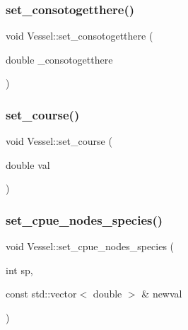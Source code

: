 \mbox{\label{class_vessel_a159a8bbab0239bd61c339ff734c7f2fc}} 
\subsubsection{\texorpdfstring{set\_consotogetthere()}{set\_consotogetthere()}}
{\footnotesize\ttfamily void Vessel\+::set\+\_\+consotogetthere (\begin{DoxyParamCaption}\item[{double}]{\+\_\+consotogetthere }\end{DoxyParamCaption})}

\mbox{\label{class_vessel_ace602731bba3ee9d57624cb50b9f4753}} 
\subsubsection{\texorpdfstring{set\_course()}{set\_course()}}
{\footnotesize\ttfamily void Vessel\+::set\+\_\+course (\begin{DoxyParamCaption}\item[{double}]{val }\end{DoxyParamCaption})}

\mbox{\label{class_vessel_a1c1e91081a41889006f16d5e599dc0f1}} 
\subsubsection{\texorpdfstring{set\_cpue\_nodes\_species()}{set\_cpue\_nodes\_species()}}
{\footnotesize\ttfamily void Vessel\+::set\+\_\+cpue\+\_\+nodes\+\_\+species (\begin{DoxyParamCaption}\item[{int}]{sp,  }\item[{const std\+::vector$<$ double $>$ \&}]{newval }\end{DoxyParamCaption})}

\mbox{\label{class_vessel_a9ff9bb88a39e33fa0ae699d7119956e9}} 
